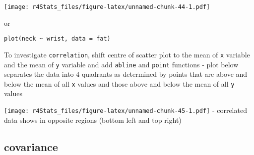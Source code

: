 \documentclass[
]{book}
\newenvironment{Shaded}{\begin{snugshade}}{\end{snugshade}}
\newcommand{\AttributeTok}[1]{\textcolor[rgb]{0.77,0.63,0.00}{#1}}
\newcommand{\CommentTok}[1]{\textcolor[rgb]{0.56,0.35,0.01}{\textit{#1}}}
\newcommand{\DecValTok}[1]{\textcolor[rgb]{0.00,0.00,0.81}{#1}}
\newcommand{\FunctionTok}[1]{\textcolor[rgb]{0.00,0.00,0.00}{#1}}
\newcommand{\NormalTok}[1]{#1}
\newcommand{\OtherTok}[1]{\textcolor[rgb]{0.56,0.35,0.01}{#1}}
\newcommand{\SpecialCharTok}[1]{\textcolor[rgb]{0.00,0.00,0.00}{#1}}
\newcommand{\StringTok}[1]{\textcolor[rgb]{0.31,0.60,0.02}{#1}}
\theoremstyle{definition}
\theoremstyle{definition}
\theoremstyle{definition}
\theoremstyle{definition}
\theoremstyle{remark}
\begin{document}
\texttt{[image: r4Stats\_files/figure-latex/unnamed-chunk-44-1.pdf]}

or

\texttt{plot(neck\ \textasciitilde{}\ wrist,\ data\ =\ fat)}

To investigate \texttt{correlation}, shift centre of scatter plot to the mean of \texttt{x} variable and the mean of \texttt{y} variable and add \texttt{abline} and \texttt{point} functions
- plot below separates the data into 4 quadrants as determined by points that are above and below the mean of all \texttt{x} values and those above and below the mean of all \texttt{y} values

\begin{Shaded}
\end{Shaded}

\texttt{[image: r4Stats\_files/figure-latex/unnamed-chunk-45-1.pdf]}
- correlated data shows in opposite regions (bottom left and top right)

\hypertarget{covariance}{%
\subsection{covariance}\label{covariance}}
\end{document}
